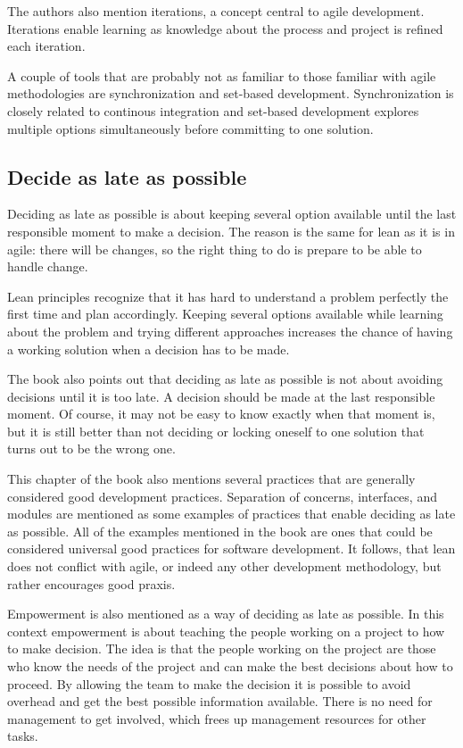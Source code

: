 The authors also mention iterations, a concept central to agile development. Iterations enable learning as knowledge about the process and project is refined each iteration. \cite{poppendieck2003lean}

A couple of tools that are probably not as familiar to those familiar with agile methodologies are synchronization and set-based development. Synchronization is closely related to continous integration and set-based development explores multiple options simultaneously before committing to one solution.\cite{poppendieck2003lean}

\subsection{Decide as late as possible}

Deciding as late as possible is about keeping several option available until the last responsible moment to make a decision. The reason is the same for lean as it is in agile: there will be changes, so the right thing to do is prepare to be able to handle change.\cite{poppendieck2003lean}

Lean principles recognize that it has hard to understand a problem perfectly the first time and plan accordingly. Keeping several options available while learning about the problem and trying different approaches increases the chance of having a working solution when a decision has to be made. \cite{poppendieck2003lean}

The book also points out that deciding as late as possible is not about avoiding decisions until it is too late. A decision should be made at the last responsible moment.\cite{poppendieck2003lean} Of course, it may not be easy to know exactly when that moment is, but it is still better than not deciding or locking oneself to one solution that turns out to be the wrong one.

This chapter of the book also mentions several practices that are generally considered good development practices. Separation of concerns, interfaces, and modules are mentioned as some examples of practices that enable deciding as late as possible.\cite{poppendieck2003lean} All of the examples mentioned in the book are ones that could be considered universal good practices for software development. It follows, that lean does not conflict with agile, or indeed any other development methodology, but rather encourages good praxis.

Empowerment is also mentioned as a way of deciding as late as possible. In this context empowerment is about teaching the people working on a project to how to make decision. The idea is that the people working on the project are those who know the needs of the project and can make the best decisions about how to proceed. By allowing the team to make the decision it is possible to avoid overhead and get the best possible information available. There is no need for management to get involved, which frees up management resources for other tasks.\cite{poppendieck2003lean}

